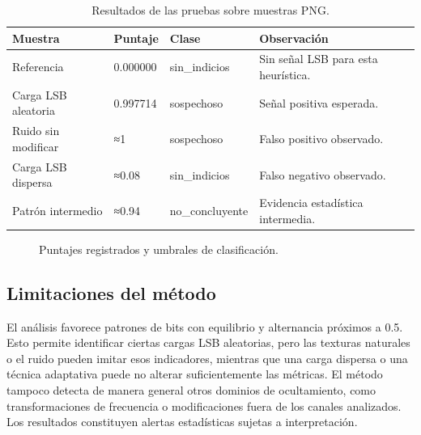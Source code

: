 \documentclass[11pt,a4paper,oneside]{article}
\begin{document}
\begin{table}[H]
\centering\small
\caption{Resultados de las pruebas sobre muestras PNG.}\label{tab:muestras}
\begin{tabularx}{\textwidth}{@{}P{3.45cm}P{2cm}P{3cm}Y@{}}\toprule
\textbf{Muestra} & \textbf{Puntaje} & \textbf{Clase} & \textbf{Observación}\\\midrule
Referencia & 0.000000 & sin\_indicios & Sin señal LSB para esta heurística.\\
Carga LSB aleatoria & 0.997714 & sospechoso & Señal positiva esperada.\\
Ruido sin modificar & ≈1 & sospechoso & Falso positivo observado.\\
Carga LSB dispersa & ≈0.08 & sin\_indicios & Falso negativo observado.\\
Patrón intermedio & ≈0.94 & no\_concluyente & Evidencia estadística intermedia.\\
\bottomrule\end{tabularx}
\end{table}

\begin{figure}[H]
\centering
{}
\caption{Puntajes registrados y umbrales de clasificación.}
\end{figure}

\subsection{Limitaciones del método}
El análisis favorece patrones de bits con equilibrio y alternancia próximos a 0.5. Esto permite identificar ciertas cargas LSB aleatorias, pero las texturas naturales o el ruido pueden imitar esos indicadores, mientras que una carga dispersa o una técnica adaptativa puede no alterar suficientemente las métricas. El método tampoco detecta de manera general otros dominios de ocultamiento, como transformaciones de frecuencia o modificaciones fuera de los canales analizados. Los resultados constituyen alertas estadísticas sujetas a interpretación.
\end{document}
